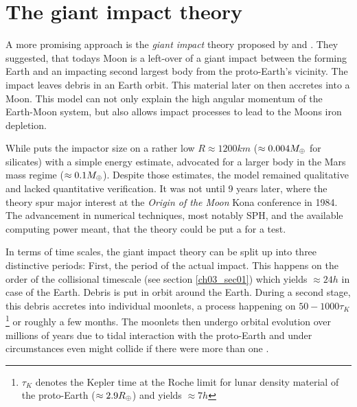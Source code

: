 \section{The giant impact theory}
A more promising approach is the \emph{giant impact} theory proposed by \cite{1975Icar...24..504H} and \cite{1976LPI.....7..120C}. They suggested, that todays Moon is a left-over of a giant impact between the forming Earth and an impacting second largest body from the proto-Earth's vicinity. The impact leaves debris in an Earth orbit. This material later on then accretes into a Moon. This model can not only explain the high angular momentum of the Earth-Moon system, but also allows impact processes to lead to the Moons iron depletion.

While \cite{1975Icar...24..504H} puts the impactor size on a rather low $R \approx 1200km$ ($\approx 0.004 M_{\oplus}$ for silicates) with a simple energy estimate, \cite{1976LPI.....7..120C} advocated for a larger body in the Mars mass regime ($\approx 0.1 M_{\oplus}$). Despite those estimates, the model remained qualitative and lacked quantitative verification. It was not until 9 years later, where the theory spur major interest at the \emph{Origin of the Moon} Kona conference in 1984. The advancement in numerical techniques, most notably SPH, and the available computing power meant, that the theory could be put a for a test. 

In terms of time scales, the giant impact theory can be split up into three distinctive periods: First, the period of the actual impact. This happens on the order of the collisional timescale (see section \ref{ch03_sec01}) which yields $\approx 24h$ in case of the Earth. Debris is put in orbit around the Earth. During a second stage, this debris accretes into individual moonlets, a process happening on $50 - 1000 \tau_K$ \footnote{$\tau_K$ denotes the Kepler time at the Roche limit for lunar density material of the proto-Earth ($\approx 2.9 R_{\oplus}$) and yields $\approx 7h$} or roughly a few months. The moonlets then undergo orbital evolution over millions of years due to tidal interaction with the proto-Earth and under circumstances even might collide if there were more than one \cite{Canup:1996p3541}.


